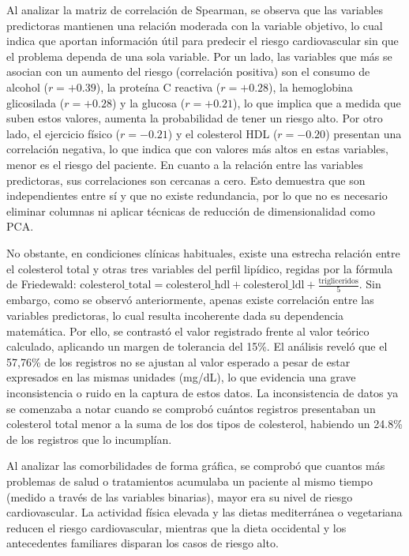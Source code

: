 \documentclass[journal,onecolumn]{IEEEtran}
\begin{document}
Al analizar la matriz de correlación de Spearman, se observa que las variables predictoras mantienen una relación moderada con la variable objetivo, lo cual indica que aportan información útil para predecir el riesgo cardiovascular sin que el problema dependa de una sola variable. Por un lado, las variables que más se asocian con un aumento del riesgo (correlación positiva) son el consumo de alcohol ($r = +0.39$), la proteína C reactiva ($r = +0.28$), la hemoglobina glicosilada ($r = +0.28$) y la glucosa ($r = +0.21$), lo que implica que a medida que suben estos valores, aumenta la probabilidad de tener un riesgo alto. Por otro lado, el ejercicio físico ($r = -0.21$) y el colesterol HDL ($r = -0.20$) presentan una correlación negativa, lo que indica que con valores más altos en estas variables, menor es el riesgo del paciente. En cuanto a la relación entre las variables predictoras, sus correlaciones son cercanas a cero. Esto demuestra que son independientes entre sí y que no existe redundancia, por lo que no es necesario eliminar columnas ni aplicar técnicas de reducción de dimensionalidad como PCA.

No obstante, en condiciones clínicas habituales, existe una estrecha relación entre el colesterol total y otras tres variables del perfil lipídico, regidas por la fórmula de Friedewald: $\text{colesterol\_total} = \text{colesterol\_hdl} + \text{colesterol\_ldl} + \frac{\text{trigliceridos}}{5}$. Sin embargo, como se observó anteriormente, apenas existe correlación entre las variables predictoras, lo cual resulta incoherente dada su dependencia matemática. Por ello, se contrastó el valor registrado frente al valor teórico calculado, aplicando un margen de tolerancia del 15\%. El análisis reveló que el 57,76\% de los registros no se ajustan al valor esperado a pesar de estar expresados en las mismas unidades (mg/dL), lo que evidencia una grave inconsistencia o ruido en la captura de estos datos. La inconsistencia de datos ya se comenzaba a notar cuando se comprobó cuántos registros presentaban un colesterol total menor a la suma de los dos tipos de colesterol, habiendo un 24.8\% de los registros que lo incumplían.


Al analizar las comorbilidades de forma gráfica, se comprobó que cuantos más problemas de salud o tratamientos acumulaba un paciente al mismo tiempo (medido a través de las variables binarias), mayor era su nivel de riesgo cardiovascular. La actividad física elevada y las dietas mediterránea o vegetariana reducen el riesgo cardiovascular, mientras que la dieta occidental y los antecedentes familiares disparan los casos de riesgo alto.
\end{document}
